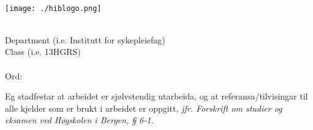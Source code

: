 %
\begin{titlepage}
\begin{center}

{%
    \hfill \forfattar\\[1cm]
}

\texttt{[image: ./hiblogo.png]}~\\[4cm]

{%
    \huge \bfseries \tittel \\[4cm]
}

{%
    \large Department (i.e. Institutt for sykepleiefag)\\
    \large Class (i.e. 13HGRS)\\
    \large \dato\\
    \large Ord: 
}

{%
    \begin{center}
         Eg stadfestar at arbeidet er sjølvstendig utarbeida, og at referansa/tilvisingar til alle kjelder som er brukt i arbeidet er oppgitt,
         \textit{jfr. Forskrift om studier og eksamen ved Høgskolen i Bergen, § 6-1.}
     \end{center}
 }

\vfill

\end{center}
\end{titlepage}
